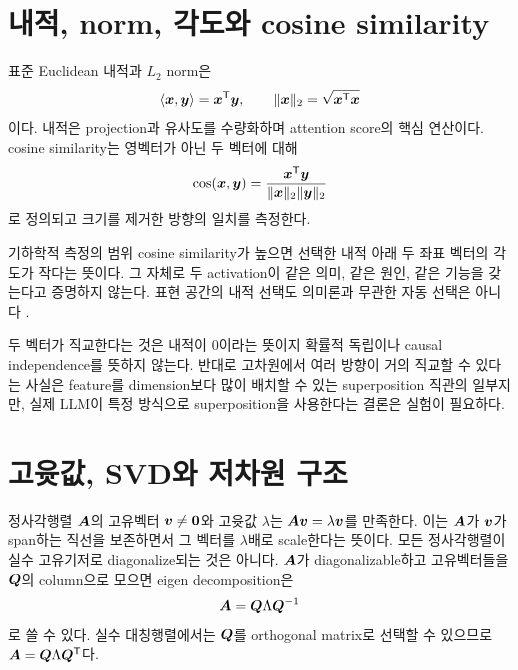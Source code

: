 \section{내적, norm, 각도와 cosine similarity}

표준 Euclidean 내적과 $L_2$ norm은
\begin{equation}
  \langle\bm{x},\bm{y}\rangle=\bm{x}^{\mathsf T}\bm{y},
  \qquad \lVert\bm{x}\rVert_2=\sqrt{\bm{x}^{\mathsf T}\bm{x}}
\end{equation}
이다.
내적은 projection과 유사도를 수량화하며 attention score의 핵심 연산이다.
cosine similarity는 영벡터가 아닌 두 벡터에 대해
\begin{equation}
  \cos(\bm{x},\bm{y})=
  \frac{\bm{x}^{\mathsf T}\bm{y}}
       {\lVert\bm{x}\rVert_2\lVert\bm{y}\rVert_2}
\end{equation}
로 정의되고 크기를 제거한 방향의 일치를 측정한다.

\begin{interpretbox}{기하학적 측정의 범위}
cosine similarity가 높으면 선택한 내적 아래 두 좌표 벡터의 각도가 작다는 뜻이다.
그 자체로 두 activation이 같은 의미, 같은 원인, 같은 기능을 갖는다고 증명하지 않는다.
표현 공간의 내적 선택도 의미론과 무관한 자동 선택은 아니다 \citep{park2024linear}.
\end{interpretbox}

두 벡터가 직교한다는 것은 내적이 0이라는 뜻이지 확률적 독립이나 causal independence를 뜻하지 않는다.
반대로 고차원에서 여러 방향이 거의 직교할 수 있다는 사실은 feature를 dimension보다 많이 배치할 수 있는 superposition 직관의 일부지만, 실제 LLM이 특정 방식으로 superposition을 사용한다는 결론은 실험이 필요하다.

\section{고윳값, SVD와 저차원 구조}

정사각행렬 $\bm{A}$의 고유벡터 $\bm{v}\neq\bm{0}$와 고윳값 $\lambda$는 $\bm{A}\bm{v}=\lambda\bm{v}$를 만족한다.
이는 $\bm{A}$가 $\bm{v}$가 span하는 직선을 보존하면서 그 벡터를 $\lambda$배로 scale한다는 뜻이다.
모든 정사각행렬이 실수 고유기저로 diagonalize되는 것은 아니다.
$\bm{A}$가 diagonalizable하고 고유벡터들을 $\bm{Q}$의 column으로 모으면 eigen decomposition은
\begin{equation}
  \bm{A}=\bm{Q}\Lambda\bm{Q}^{-1}
\end{equation}
로 쓸 수 있다.
실수 대칭행렬에서는 $\bm{Q}$를 orthogonal matrix로 선택할 수 있으므로 $\bm{A}=\bm{Q}\Lambda\bm{Q}^{\mathsf T}$다.

